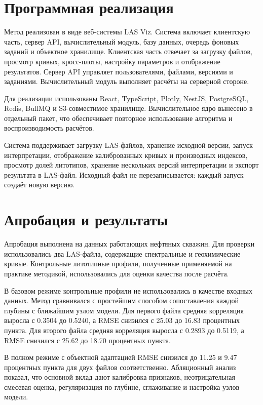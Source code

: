 \documentclass[master,summary]{pmk-graduate}
\begin{document}
\section{Программная реализация}

Метод реализован в виде веб-системы LAS Viz. Система включает клиентскую часть, сервер API, вычислительный модуль, базу данных, очередь фоновых заданий и объектное хранилище. Клиентская часть отвечает за загрузку файлов, просмотр кривых, кросс-плоты, настройку параметров и отображение результатов. Сервер API управляет пользователями, файлами, версиями и заданиями. Вычислительный модуль выполняет расчёты на серверной стороне.

Для реализации использованы React, TypeScript, Plotly, NestJS, PostgreSQL, Redis, BullMQ и S3-совместимое хранилище. Вычислительное ядро вынесено в отдельный пакет, что обеспечивает повторное использование алгоритма и воспроизводимость расчётов.

Система поддерживает загрузку LAS-файлов, хранение исходной версии, запуск интерпретации, отображение калиброванных кривых и производных индексов, просмотр долей литотипов, хранение нескольких версий интерпретации и экспорт результата в LAS-файл. Исходный файл не перезаписывается: каждый запуск создаёт новую версию.

\section{Апробация и результаты}

Апробация выполнена на данных работающих нефтяных скважин. Для проверки использовались два LAS-файла, содержащие спектральные и геохимические кривые. Контрольные литотипные профили, полученные применяемой на практике методикой, использовались для оценки качества после расчёта.

В базовом режиме контрольные профили не использовались в качестве входных данных. Метод сравнивался с простейшим способом сопоставления каждой глубины с ближайшим узлом модели. Для первого файла средняя корреляция выросла с 0.3504 до 0.5240, а RMSE снизился с 25.03 до 16.83 процентных пункта. Для второго файла средняя корреляция выросла с 0.2893 до 0.5119, а RMSE снизился с 25.62 до 18.70 процентных пункта.

В полном режиме с объектной адаптацией RMSE снизился до 11.25 и 9.47 процентных пункта для двух файлов соответственно. Абляционный анализ показал, что основной вклад дают калибровка признаков, неотрицательная смесевая оценка, регуляризация по глубине, сглаживание и настройка узлов модели.
\end{document}
